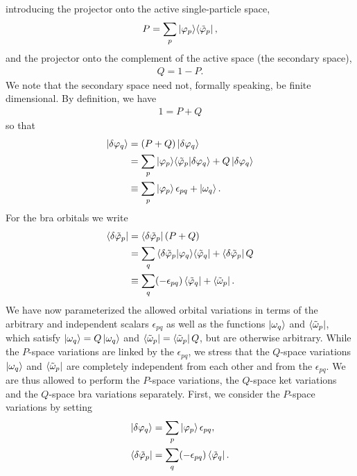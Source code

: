 \documentclass[aip,jcp,preprint,superscriptaddress,nofootinbib]{revtex4-1}
\begin{document}
introducing the projector onto the active single-particle space,
\begin{align} \label{eq:P_proj_def}
    P = \sum_{p}  \ket{\varphi_{p}} \! \bra{\tilde{\varphi}_{p}},
\end{align}
and the projector onto the complement of the active space
(the secondary space),
\begin{align} \label{eq:Q_proj_def}
    Q = 1 - P.
\end{align}
We note that the secondary space need not, formally speaking, be finite dimensional.
By definition, we have
\begin{align}
    1 = P + Q
\end{align}
so that
\begin{align} \label{eq:general_phiket_variation}
    \ket{\delta\varphi_{q}} 
    &= (P + Q) \ket{\delta\varphi_{q}} \nonumber\\
    &= \sum_{p}  \ket{\varphi_{p}} \! \braket{{\tilde{\varphi}_{p}} | \delta\varphi_{q}} + Q \ket{\delta\varphi_{q}} \nonumber\\
    &\equiv \sum_{p} \ket{\varphi_{p}} \epsilon_{pq} + \ket{\omega_q}.
\end{align}
For the bra orbitals we write
\begin{align} \label{eq:general_phibra_variation}
    \bra{\delta\tilde{\varphi}_{p}} 
    &= \bra{\delta\tilde{\varphi}_{p}} (P + Q) \nonumber\\
    &= \sum_{q} \braket{\delta\tilde{\varphi}_{p} | \varphi_{q}} \! \bra{\tilde{\varphi}_{q}}
    + \bra{\delta\tilde{\varphi}_{p}} Q  \nonumber\\
    &\equiv
    \sum_{q} (-\epsilon_{pq}) \bra{\tilde{\varphi}_{q}} + \bra{\tilde{\omega}_p}.
\end{align}
We have now parameterized the allowed orbital
variations
in terms of the arbitrary and independent scalars $\epsilon_{pq}$ 
as well as the functions $\ket{\omega_q}$ and $\bra{\tilde{\omega}_p}$,
which satisfy
$\ket{\omega_q} = Q \ket{\omega_q} $ and
$\bra{\tilde{\omega}_p} = \bra{\tilde{\omega}_p} Q$, but are otherwise
arbitrary. While the
$P$-space variations are linked by
the $\epsilon_{pq}$, we stress that the $Q$-space variations $\ket{\omega_q}$ and $\bra{\tilde{\omega}_p}$
are completely independent from each other and from the $\epsilon_{pq}$. We are thus allowed
to perform the $P$-space variations, the $Q$-space ket variations 
and the $Q$-space bra variations separately.
First, we consider the $P$-space variations by setting
\begin{subequations} \label{eq:P_space_variations_pq}
    \begin{align} 
        \ket{\delta\varphi_{q}} &= \sum_{p} \ket{\varphi_{p}} \epsilon_{pq}, \\
        \bra{\delta\tilde{\varphi}_{p}} &= \sum_{q} (-\epsilon_{pq}) \bra{\tilde{\varphi}_{q}}.
    \end{align}
\end{subequations}
\end{document}
